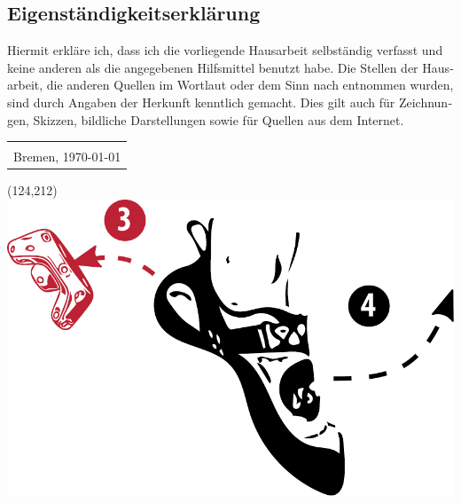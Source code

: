 \begin{german}
	\thispagestyle{plain}
	\section*{Eigenständigkeitserklärung}
	
	Hiermit erkläre ich, dass ich die vorliegende Hausarbeit selbständig verfasst und keine anderen als die angegebenen Hilfsmittel benutzt habe.
	Die Stellen der Hausarbeit, die anderen Quellen im Wortlaut oder dem Sinn nach entnommen wurden, sind durch Angaben der Herkunft kenntlich gemacht. Dies gilt auch für Zeichnungen, Skizzen, bildliche Darstellungen sowie für Quellen aus dem Internet.
	
	
	\vspace{4\baselineskip}
	\noindent%
	\begin{tabular}{@{}p{5cm}@{}}
		\\ \hline \\[-.75\normalbaselineskip]
		Bremen, \today
	\end{tabular} 

	\begin{textblock}{20}(124,212)
		\includegraphics[scale=0.3]{include/images/climbing-shoe-with-instructions-off.pdf}
	\end{textblock}
\end{german}